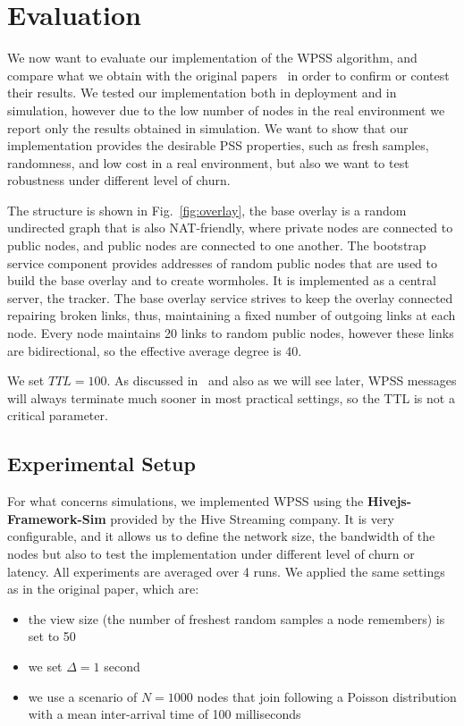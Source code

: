 
\chapter{Evaluation}
\label{cha:evaluation}
We now want to evaluate our implementation of the WPSS algorithm, and compare what we obtain with the original papers~\cite{wormhole} in order to confirm or contest their results. We tested our implementation both in deployment and in simulation, however due to the low number of nodes in the real environment we report only the results obtained in simulation. We want to show that our implementation provides the desirable PSS properties, such as fresh samples, randomness, and low cost in a real environment, but also we want to test robustness under different level of churn.

The structure is shown in Fig.~\ref{fig:overlay}, the base overlay is a random undirected graph that is also NAT-friendly, where private nodes are connected to public nodes, and public nodes are connected to one another. The bootstrap service component provides addresses of random public nodes that are used to build the base overlay and to create wormholes. It is implemented as a central server, the tracker. The base overlay service strives to keep the overlay connected repairing broken links, thus, maintaining a fixed number of outgoing links at each node. Every node maintains 20 links to random public nodes, however these links are bidirectional, so the effective average degree is 40. 

We set $TTL = 100$. As discussed in~\cite{wormhole} and also as we will see later, WPSS messages will always terminate much sooner in most practical settings, so the TTL is not a critical parameter.

\section{Experimental Setup}
\label{sec:exp_setup}
For what concerns simulations, we implemented WPSS using the \textbf{Hivejs-Framework-Sim} provided by the Hive Streaming company. It is very configurable, and it allows us to define the network size, the bandwidth of the nodes but also to test the implementation under different level of churn or latency. All experiments are averaged over 4 runs. We applied the same settings as in the original paper, which are: 

\begin{itemize}
	\item the view size (the number of freshest random samples a node remembers) is set to 50
	\item we set $\Delta = 1$ second
	\item we use a scenario of $N = 1000$ nodes that join following a Poisson distribution with a mean inter-arrival time of 100 milliseconds
\end{itemize}

